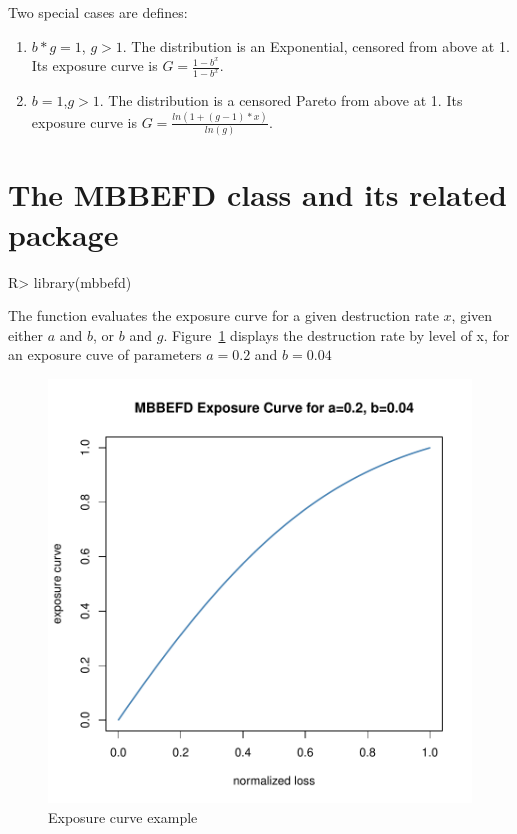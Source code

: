 \documentclass[nojss]{jss}
\begin{document}
Two special cases are defines:
\begin{enumerate}

\item $b*g=1$, $g>1$. The distribution is an Exponential, censored from above at 1. Its exposure curve is $G=\frac{1-b^x}{1-b^x}$.
\item $b=1$,$g>1$. The distribution is a censored Pareto from above at 1. Its exposure curve is $G=\frac{ln( 1+( g-1 )*x)}{ln\left( g \right)}$.

\end{enumerate}

\section{The MBBEFD class and its related package}\label{sec:package}

\begin{Schunk}
\begin{Sinput}
R> library(mbbefd)
\end{Sinput}
\end{Schunk}


The  function evaluates the exposure curve for a given destruction rate $x$, given either $a$ and $b$, or $b$ and $g$. Figure~\ref{fig:G1} displays the destruction rate by level of x, for an exposure cuve of parameters $a=0.2$ and $b=0.04$



\begin{figure}
\begin{center}
\includegraphics{mbbefd-drateplot}
\caption{Exposure curve example}
\label{fig:G1}
\end{center}
\end{figure}
\end{document}
